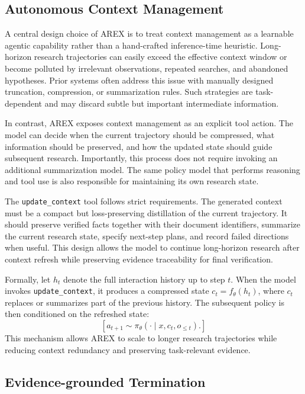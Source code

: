 \documentclass[]{selfevolagent}
\theoremstyle{plain}
\theoremstyle{definition}
\theoremstyle{remark}
\begin{document}
\subsection{Autonomous Context Management}

A central design choice of \textsc{AREX} is to treat context management as a learnable agentic capability rather than a hand-crafted inference-time heuristic. Long-horizon research trajectories can easily exceed the effective context window or become polluted by irrelevant observations, repeated searches, and abandoned hypotheses. Prior systems often address this issue with manually designed truncation, compression, or summarization rules. Such strategies are task-dependent and may discard subtle but important intermediate information.

In contrast, \textsc{AREX} exposes context management as an explicit tool action. The model can decide when the current trajectory should be compressed, what information should be preserved, and how the updated state should guide subsequent research. Importantly, this process does not require invoking an additional summarization model. The same policy model that performs reasoning and tool use is also responsible for maintaining its own research state.

The \texttt{update\_context} tool follows strict requirements. The generated context must be a compact but loss-preserving distillation of the current trajectory. It should preserve verified facts together with their document identifiers, summarize the current research state, specify next-step plans, and record failed directions when useful. This design allows the model to continue long-horizon research after context refresh while preserving evidence traceability for final verification.

Formally, let $h_t$ denote the full interaction history up to step $t$. When the model invokes \texttt{update\_context}, it produces a compressed state $c_t = f_{\theta}(h_t)$, where $c_t$ replaces or summarizes part of the previous history. The subsequent policy is then conditioned on the refreshed state:
$$
[
a_{t+1} \sim \pi_{\theta}(\cdot \mid x, c_t, o_{\leq t}).
]
$$
This mechanism allows \textsc{AREX} to scale to longer research trajectories while reducing context redundancy and preserving task-relevant evidence.

\subsection{Evidence-grounded Termination}
\end{document}
